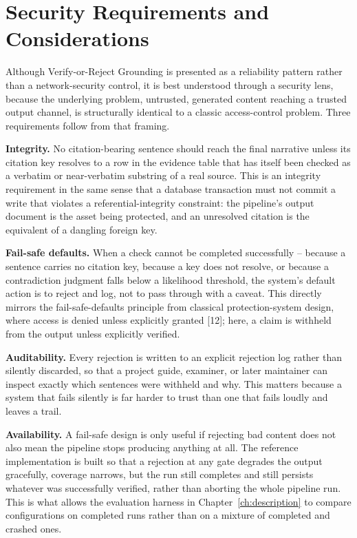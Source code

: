 \documentclass[12pt,a4paper]{report}
\begin{document}
\section{Security Requirements and Considerations}
Although Verify-or-Reject Grounding is presented as a reliability pattern
rather than a network-security control, it is best understood through a
security lens, because the underlying problem, untrusted, generated content
reaching a trusted output channel, is structurally identical to a classic
access-control problem. Three requirements follow from that framing.

\textbf{Integrity.} No citation-bearing sentence should reach the final
narrative unless its citation key resolves to a row in the evidence table that
has itself been checked as a verbatim or near-verbatim substring of a real
source. This is an integrity requirement in the same sense that a database
transaction must not commit a write that violates a referential-integrity
constraint: the pipeline's output document is the asset being protected, and an
unresolved citation is the equivalent of a dangling foreign key.

\textbf{Fail-safe defaults.} When a check cannot be completed successfully --
because a sentence carries no citation key, because a key does not resolve, or
because a contradiction judgment falls below a likelihood threshold, the
system's default action is to reject and log, not to pass through with a
caveat. This directly mirrors the fail-safe-defaults principle from classical
protection-system design, where access is denied unless explicitly granted
[12]; here, a claim is withheld from the output unless
explicitly verified.

\textbf{Auditability.} Every rejection is written to an explicit rejection log
rather than silently discarded, so that a project guide, examiner, or later
maintainer can inspect exactly which sentences were withheld and why. This
matters because a system that fails silently is far harder to trust than one
that fails loudly and leaves a trail.

\textbf{Availability.} A fail-safe design is only useful if rejecting bad
content does not also mean the pipeline stops producing anything at all. The
reference implementation is built so that a rejection at any gate degrades the
output gracefully, coverage narrows, but the run still completes and still
persists whatever was successfully verified, rather than aborting the whole
pipeline run. This is what allows the evaluation harness in
Chapter~\ref{ch:description} to compare configurations on completed runs
rather than on a mixture of completed and crashed ones.
\end{document}

